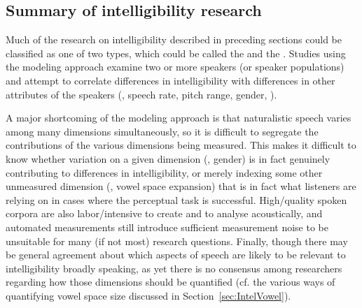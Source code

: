 
\subsection{Summary of intelligibility research\label{sec:IntelSummary}}
Much of the research on intelligibility described in preceding sections could be classified as one of two types, which could be called the  and the .  Studies using the modeling approach examine two or more speakers (or speaker populations) and attempt to correlate differences in intelligibility with differences in other attributes of the speakers (\eg, speech rate, pitch range, gender, \etc).\footnotemark{}  

A major shortcoming of the modeling approach is that naturalistic speech varies among many dimensions simultaneously, so it is difficult to segregate the contributions of the various dimensions being measured.  This makes it difficult to know whether variation on a given dimension (\eg, gender) is in fact genuinely contributing to differences in intelligibility, or merely indexing some other unmeasured dimension (\eg, vowel space expansion) that is in fact what listeners are relying on in cases where the perceptual task is successful.  High\-/quality spoken corpora are also labor\-/intensive to create and to analyse acoustically, and automated measurements still introduce sufficient measurement noise to be unsuitable for many (if not most) research questions.  Finally, though there may be general agreement about which aspects of speech are likely to be relevant to intelligibility broadly speaking, as yet there is no consensus among researchers regarding how those dimensions should be quantified (cf. the various ways of quantifying vowel space size discussed in Section~\ref{sec:IntelVowel}).

